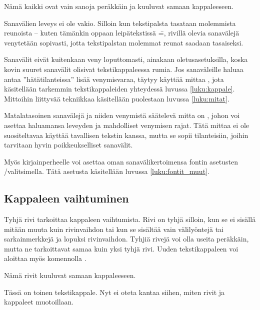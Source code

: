 \begin{tulossis}
  Nämä kaikki ovat vain sanoja peräkkäin ja kuuluvat samaan
  kappaleeseen.
\end{tulossis}

Sanavälien leveys ei ole vakio. Silloin kun tekstipalsta tasataan
molemmista reunoista -- kuten tämänkin oppaan leipätekstissä \==,
rivillä olevia sanavälejä venytetään sopivasti, jotta tekstipalstan
molemmat reunat saadaan tasaiseksi.

Sanavälit eivät kuitenkaan veny loputtomasti, ainakaan
oletusasetuksilla, koska kovin suuret sanavälit olisivat
tekstikappaleessa rumia. Jos sanaväleille haluaa antaa
''hätätilanteissa'' lisää venymisvaraa, täytyy käyttää mittaa
, jota käsitellään tarkemmin
tekstikappaleiden yhteydessä luvussa \ref{luku:kappale}. Mittoihin
liittyvää tekniikkaa käsitellään puolestaan luvussa \ref{luku:mitat}.

Matalatasoinen sanavälejä ja niiden venymistä säätelevä mitta on
, johon voi asettaa haluamansa leveyden ja
mahdolliset venymisen rajat. Tätä mittaa ei ole suositeltavaa käyttää
tavallisen tekstin kanssa, mutta se sopii tilanteisiin, joihin tarvitaan
hyvin poikkeukselliset sanavälit.

\begin{koodilohkosis}
  \setlength{\spaceskip}{0.8em plus 0.3em minus 0.2em}
\end{koodilohkosis}

Myös kirjainperheelle voi asettaa oman sanavälikertoimensa fontin
asetusten \-/valitsimella. Tätä asetusta käsitellään
luvussa \ref{luku:fontit_muut}.

\subsection{Kappaleen vaihtuminen}

Tyhjä rivi tarkoittaa kappaleen vaihtumista. Rivi on tyhjä silloin, kun
se ei sisällä mitään muuta kuin rivinvaihdon tai kun se sisältää vain
välilyöntejä tai sarkainmerkkejä ja lopuksi rivinvaihdon. Tyhjiä rivejä
voi olla useita peräkkäin, mutta ne tarkoittavat samaa kuin yksi tyhjä
rivi. Uuden tekstikappaleen voi aloittaa myös komennolla .

\begin{koodilohkosis}
  Nämä rivit kuuluvat
  samaan kappaleeseen.

  Tässä on toinen tekstikappale.
  Nyt ei oteta kantaa siihen, miten
  rivit ja kappaleet muotoillaan.
\end{koodilohkosis}

